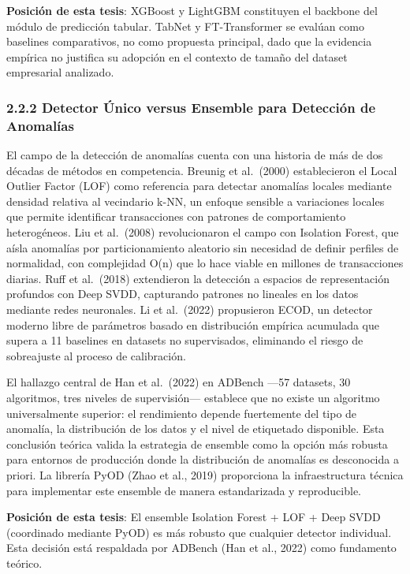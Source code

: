\textbf{Posición de esta tesis}: XGBoost y LightGBM constituyen el
backbone del módulo de predicción tabular. TabNet y FT-Transformer se
evalúan como baselines comparativos, no como propuesta principal, dado
que la evidencia empírica no justifica su adopción en el contexto de
tamaño del dataset empresarial analizado.

\subsubsection{2.2.2 Detector Único versus Ensemble para Detección de
Anomalías}\label{detector-uxfanico-versus-ensemble-para-detecciuxf3n-de-anomaluxedas}

El campo de la detección de anomalías cuenta con una historia de más de
dos décadas de métodos en competencia. Breunig et al.~(2000)
establecieron el Local Outlier Factor (LOF) como referencia para
detectar anomalías locales mediante densidad relativa al vecindario
k-NN, un enfoque sensible a variaciones locales que permite identificar
transacciones con patrones de comportamiento heterogéneos. Liu et
al.~(2008) revolucionaron el campo con Isolation Forest, que aísla
anomalías por particionamiento aleatorio sin necesidad de definir
perfiles de normalidad, con complejidad O(n) que lo hace viable en
millones de transacciones diarias. Ruff et al.~(2018) extendieron la
detección a espacios de representación profundos con Deep SVDD,
capturando patrones no lineales en los datos mediante redes neuronales.
Li et al.~(2022) propusieron ECOD, un detector moderno libre de
parámetros basado en distribución empírica acumulada que supera a 11
baselines en datasets no supervisados, eliminando el riesgo de
sobreajuste al proceso de calibración.

El hallazgo central de Han et al.~(2022) en ADBench ---57 datasets, 30
algoritmos, tres niveles de supervisión--- establece que no existe un
algoritmo universalmente superior: el rendimiento depende fuertemente
del tipo de anomalía, la distribución de los datos y el nivel de
etiquetado disponible. Esta conclusión teórica valida la estrategia de
ensemble como la opción más robusta para entornos de producción donde la
distribución de anomalías es desconocida a priori. La librería PyOD
(Zhao et al., 2019) proporciona la infraestructura técnica para
implementar este ensemble de manera estandarizada y reproducible.

\textbf{Posición de esta tesis}: El ensemble Isolation Forest + LOF +
Deep SVDD (coordinado mediante PyOD) es más robusto que cualquier
detector individual. Esta decisión está respaldada por ADBench (Han et
al., 2022) como fundamento teórico.

